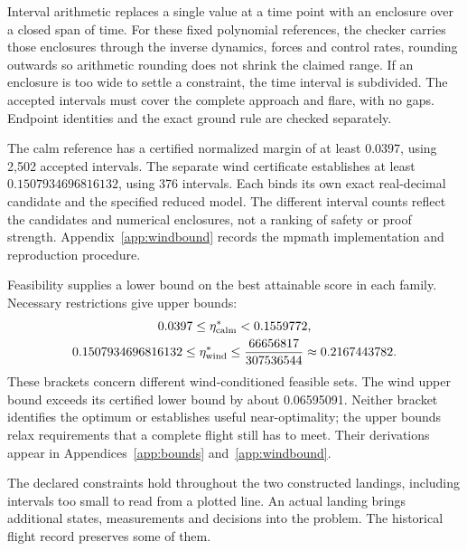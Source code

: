 
Interval arithmetic replaces a single value at a time point with an enclosure over a closed span of time. For these fixed polynomial references, the checker carries those enclosures through the inverse dynamics, forces and control rates, rounding outwards so arithmetic rounding does not shrink the claimed range. If an enclosure is too wide to settle a constraint, the time interval is subdivided. The accepted intervals must cover the complete approach and flare, with no gaps. Endpoint identities and the exact ground rule are checked separately.

The calm reference has a certified normalized margin of at least $0.0397$, using 2,502 accepted intervals. The separate wind certificate establishes at least $0.1507934696816132$, using 376 intervals. Each binds its own exact real-decimal candidate and the specified reduced model. The different interval counts reflect the candidates and numerical enclosures, not a ranking of safety or proof strength. Appendix~\ref{app:windbound} records the mpmath implementation and reproduction procedure.

Feasibility supplies a lower bound on the best attainable score in each family. Necessary restrictions give upper bounds:
\[
\begin{gathered}
0.0397\leq\eta^*_{\rm calm}<0.1559772,\\
0.1507934696816132\leq\eta^*_{\rm wind}
\leq\frac{66656817}{307536544}\approx0.2167443782.
\end{gathered}
\]
These brackets concern different wind-conditioned feasible sets. The wind upper bound exceeds its certified lower bound by about 0.06595091. Neither bracket identifies the optimum or establishes useful near-optimality; the upper bounds relax requirements that a complete flight still has to meet. Their derivations appear in Appendices~\ref{app:bounds} and~\ref{app:windbound}.

The declared constraints hold throughout the two constructed landings, including intervals too small to read from a plotted line. An actual landing brings additional states, measurements and decisions into the problem. The historical flight record preserves some of them.
